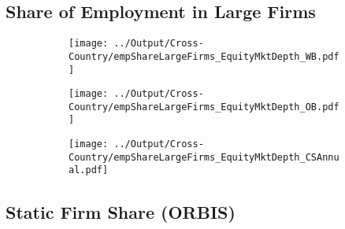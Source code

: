 \documentclass[12pt,notitlepage]{article}
\begin{document}
\subsection{Share of Employment in Large Firms}
\begin{figure}[!htpb]
\centering
\begin{subfigure}{.49\textwidth}
    \centering
 \texttt{[image: ../Output/Cross-Country/empShareLargeFirms\_EquityMktDepth\_WB.pdf]}
\end{subfigure}
\begin{subfigure}{.49\textwidth}
    \centering
  \texttt{[image: ../Output/Cross-Country/empShareLargeFirms\_EquityMktDepth\_OB.pdf]}
\end{subfigure}
\begin{subfigure}{.49\textwidth}
    \centering
  \texttt{[image: ../Output/Cross-Country/empShareLargeFirms\_EquityMktDepth\_CSAnnual.pdf]}
\end{subfigure}
\end{figure}

\clearpage




\subsection{Static Firm Share (ORBIS)}

\begin{table}[!htpb]
\end{table}
\end{document}
